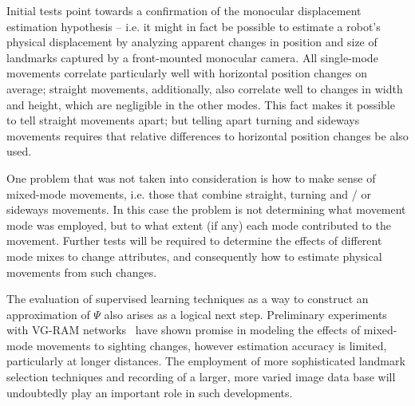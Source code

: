 \documentclass[twocolumn, 9pt]{jsproceedings}
\begin{document}
Initial tests point towards a confirmation of the monocular displacement estimation hypothesis -- i.e. it might in fact be possible to estimate a robot's physical displacement by analyzing apparent changes in position and size of landmarks captured by a front-mounted monocular camera. All single-mode movements correlate particularly well with horizontal position changes on average; straight movements, additionally, also correlate well to changes in width and height, which are negligible in the other modes. This fact makes it possible to tell straight movements apart; but telling apart turning and sideways movements requires that relative differences to horizontal position changes be also used.

One problem that was not taken into consideration is how to make sense of mixed-mode movements, i.e. those that combine straight, turning and / or sideways movements. In this case the problem is not determining what movement mode was employed, but to what extent (if any) each mode contributed to the movement. Further tests will be required to determine the effects of different mode mixes to change attributes, and consequently how to estimate physical movements from such changes.

The evaluation of supervised learning techniques as a way to construct an approximation of \(\Psi\) also arises as a logical next step. Preliminary experiments with VG-RAM networks~\cite{helio13} have shown promise in modeling the effects of mixed-mode movements to sighting changes, however estimation accuracy is limited, particularly at longer distances. The employment of more sophisticated landmark selection techniques and recording of a larger, more varied image data base will undoubtedly play an important role in such developments.

\footnotesize




\normalsize
\end{document}
